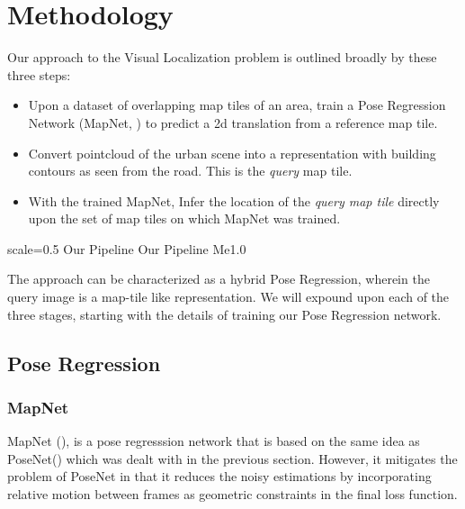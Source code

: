 

\chapter{Methodology}
Our approach to the Visual Localization problem is outlined broadly by these three steps:

\begin{itemize}
	\item Upon a dataset of overlapping map tiles of an area, train a Pose Regression Network (MapNet, \cite{Brahmbhatt2018}) to predict a 2d translation from a reference map tile. \\
	
	\item Convert pointcloud of the urban scene into a representation with building contours as seen from the road. This is the \emph{query} map tile.\\
	
	\item With the trained MapNet, Infer the location of the \emph{query map tile} directly upon the set of map tiles on which MapNet was trained.\\  
\end{itemize}

{scale=0.5}%
{Our Pipeline}%
{Our Pipeline}%
{Me1.0} 

The approach can be characterized as a hybrid Pose Regression, wherein the query image is a map-tile like representation. We will expound upon each of the three stages, starting with the details of training our Pose Regression network.   

\section{Pose Regression}
\subsection{MapNet}
MapNet (\cite{Brahmbhatt2018}), is a pose regresssion network that is based on the same idea as PoseNet(\cite{Kendall2015}) which was dealt with in the previous section. However, it mitigates the problem of PoseNet in that it reduces the noisy estimations by incorporating relative motion between frames as geometric constraints in the final loss function. 

